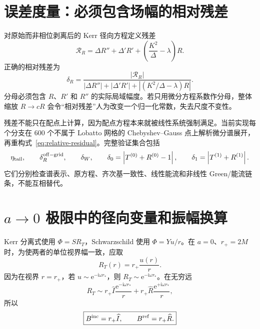 \documentclass[UTF8,fontset=fandol,11pt,a4paper,oneside]{ctexart}
\numberwithin{equation}{section}
\newcommand{\ii}{\mathrm i}
\newcommand{\ee}{\mathrm e}
\newcommand{\Bin}{B^{\rm inc}}
\newcommand{\Bref}{B^{\rm ref}}
\newcommand{\Deltak}{\Delta}
\newcommand{\abs}[1]{\left|#1\right|}
\begin{document}
\section{误差度量：必须包含场幅的相对残差}
\label{sec:diagnostics}

对原始而非相位剥离后的 Kerr 径向方程定义残差
\begin{equation}
\mathcal R_R=\Deltak R''+\Deltak'R'
+\left(\frac{K^2}{\Deltak}-\lambda\right)R.
\end{equation}
正确的相对残差为
\begin{equation}
\boxed{
\delta_R=
\frac{\abs{\mathcal R_R}}
{\abs{\Deltak R''}+\abs{\Deltak'R'}
+\abs{(K^2/\Deltak-\lambda)R}}.}
\label{eq:relative-residual}
\end{equation}
分母必须包含 $R$、$R'$ 和 $R''$ 的实际局域幅度。若只用微分方程系数作分母，整体缩放 $R\to cR$ 会令“相对残差”人为改变一个归一化常数，失去尺度不变性。

残差不能只在配点上计算，因为配点方程本来就被线性系统强制满足。当前实现每个分支在 600 个不属于 Lobatto 网格的 Chebyshev--Gauss 点上解析微分谱展开，再重构式~\eqref{eq:relative-residual}。完整验证集合包括
\begin{equation}
\eta_{\rm tail},\qquad
\delta_R^{\rm off-grid},\qquad
\delta_W,\qquad
\delta_0=\abs{T^{(0)}+R^{(0)}-1},\qquad
\delta_1=\abs{T^{(1)}+R^{(1)}}.
\label{eq:all-diagnostics}
\end{equation}
它们分别检查谱表示、原方程、齐次基一致性、线性能流和非线性 Green/能流链条，不能互相替代。


\section{\texorpdfstring{$a\to0$}{a to 0} 极限中的径向变量和振幅换算}
\label{sec:a0}

Kerr 分离式使用 $\Phi=SR_T$，Schwarzschild 使用 $\Phi=Yu/r$。在 $a=0$、$r_+=2M$ 时，为使两者的单位视界幅一致，应取
\begin{equation}
\boxed{R_T(r)=r_+\frac{u(r)}{r}.}
\label{eq:RT-u}
\end{equation}
因为在视界 $r=r_+$，若 $u\sim\ee^{-\ii\omega r_*}$，则 $R_T\sim\ee^{-\ii\omega r_*}$。在无穷远
\begin{equation}
R_T\sim r_+\widehat I\frac{\ee^{-\ii\omega r_*}}{r}
+r_+\widehat R\frac{\ee^{+\ii\omega r_*}}{r},
\end{equation}
所以
\begin{equation}
\boxed{\Bin=r_+\widehat I,\qquad \Bref=r_+\widehat R.}
\label{eq:B-I}
\end{equation}
\end{document}

